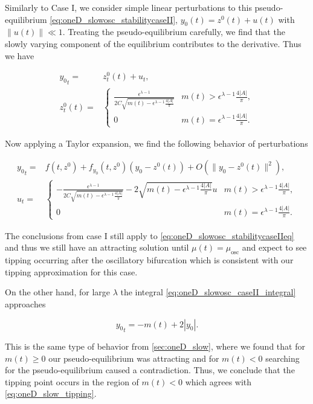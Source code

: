 \indent Similarly to Case I, we consider simple linear perturbations to this pseudo-equilibrium \eqref{eq:oneD_slowosc_stabilitycaseII}, $y_0(t)=z^0(t)+u(t)$ with $\lVert u(t) \rVert \ll 1$. Treating the pseudo-equilibrium carefully, we find that the slowly varying component of the equilibrium contributes to the derivative. Thus we have

\begin{equation}
\begin{aligned}
{y_0}_t =& z^0_t(t) +u_t,\\
z^0_t(t) = & \begin{cases}
\frac{\epsilon^{\lambda-1}}{2C\sqrt{m(t)-\epsilon^{\lambda-1}\frac{4|A|}{\pi}}} & m(t)> \epsilon^{\lambda-1}\frac{4|A|}{\pi},\\
0 & m(t) =\epsilon^{\lambda-1}\frac{4|A|}{\pi}.
\end{cases}
\end{aligned}
\end{equation}

Now applying a Taylor expansion, we find the following behavior of perturbations

\begin{equation}\label{eq:oneD_slowosc_stabilitycaseIIeq}
\begin{aligned}
{y_0}_t =& f(t,z^0)+f_{y_0}(t,z^0)(y_0-z^0(t))+O(\lVert y_0-z^0(t) \rVert^2),\\
u_t =&\begin{cases}
-\frac{\epsilon^{\lambda-1}}{2C\sqrt{m(t)-\epsilon^{\lambda-1}\frac{4|A|}{\pi}}}-2\sqrt{m(t)-\epsilon^{\lambda-1}\frac{4|A|}{\pi}} u & m(t)>\epsilon^{\lambda-1}\frac{4|A|}{\pi},\\
0 & m(t)=\epsilon^{\lambda-1}\frac{4|A|}{\pi}.
\end{cases}
\end{aligned}
\end{equation}

The conclusions from case I still apply to \eqref{eq:oneD_slowosc_stabilitycaseIIeq} and thus we still have an attracting solution until $\mu(t)=\mu_{\text{osc}}$ and expect to see tipping occurring after the oscillatory bifurcation which is consistent with our tipping approximation for this case.

\indent On the other hand, for large $\lambda$ the integral \eqref{eq:oneD_slowosc_caseII_integral} approaches

\begin{equation}\label{eq:oneD_slowosc_stabilitycaseII}
{y_0}_t=-m(t)+2|y_0|.
\end{equation}

This is the same type of behavior from \autoref{sec:oneD_slow}, where we found that for $m(t)\ge 0$ our pseudo-equilibrium was attracting and for $m(t)<0$ searching for the pseudo-equilibrium caused a contradiction. Thus, we conclude that the tipping point occurs in the region of $m(t)<0$ which agrees with \eqref{eq:oneD_slow_tipping}.
